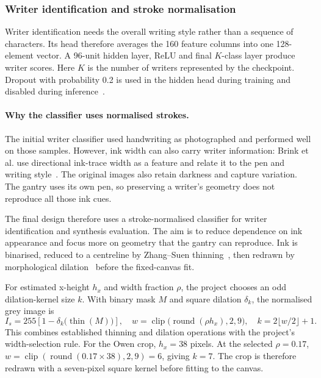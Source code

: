 \subsubsection{Writer identification and stroke normalisation}
\label{sec:des-shapenamer}
Writer identification needs the overall writing style rather than a sequence of characters. Its head therefore averages the 160 feature columns into one 128-element vector. A 96-unit hidden layer, ReLU and final $K$-class layer produce writer scores. Here $K$ is the number of writers represented by the checkpoint. Dropout with probability 0.2 is used in the hidden head during training and disabled during inference~\cite[pp.~1931, 1934]{srivastava2014}.

\paragraph{Why the classifier uses normalised strokes.}
The initial writer classifier used handwriting as photographed and performed well on those samples. However, ink width can also carry writer information: Brink et al. use directional ink-trace width as a feature and relate it to the pen and writing style~\cite[p.~162]{brink2012}. The original images also retain darkness and capture variation. The gantry uses its own pen, so preserving a writer's geometry does not reproduce all those ink cues.

The final design therefore uses a stroke-normalised classifier for writer identification and synthesis evaluation. The aim is to reduce dependence on ink appearance and focus more on geometry that the gantry can reproduce. Ink is binarised, reduced to a centreline by Zhang--Suen thinning~\cite[p.~237]{zhang1984}, then redrawn by morphological dilation~\cite[p.~533]{haralick1987} before the fixed-canvas fit.

For estimated x-height $h_x$ and width fraction $\rho$, the project chooses an odd dilation-kernel size $k$. With binary mask $M$ and square dilation $\delta_k$, the normalised grey image is
\begin{equation}
I_s=255\left[1-\delta_k\bigl(\operatorname{thin}(M)\bigr)\right],\quad
w=\operatorname{clip}\bigl(\operatorname{round}(\rho h_x),2,9\bigr),\quad
k=2\lfloor w/2\rfloor+1.
\label{eq:des-strokenorm}
\end{equation}
This combines established thinning and dilation operations with the project's width-selection rule. For the Owen crop, $h_x=38$ pixels. At the selected $\rho=0.17$, $w=\operatorname{clip}(\operatorname{round}(0.17\times38),2,9)=6$, giving $k=7$. The crop is therefore redrawn with a seven-pixel square kernel before fitting to the canvas.

